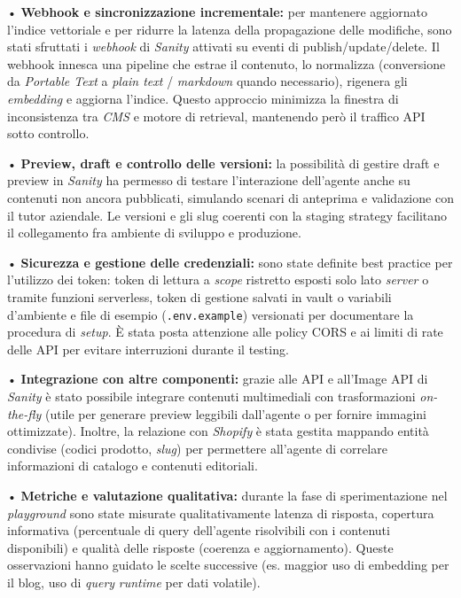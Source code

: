 • \textbf{Webhook e sincronizzazione incrementale:} per mantenere aggiornato l'indice vettoriale e per ridurre la latenza della propagazione delle modifiche, sono stati sfruttati i 
\emph{webhook} di \emph{Sanity} attivati su eventi di publish/update/delete. Il webhook innesca una pipeline che estrae il contenuto, lo normalizza 
(conversione da \emph{Portable Text} a \emph{plain text} / \emph{markdown} quando necessario), 
rigenera gli \emph{embedding} e aggiorna l'indice. 
Questo approccio minimizza la finestra di inconsistenza tra \emph{CMS} e motore di retrieval, mantenendo però il traffico API sotto controllo.

• \textbf{Preview, draft e controllo delle versioni:} la possibilità di gestire draft e preview in \emph{Sanity} 
ha permesso di testare l'interazione dell'agente anche su contenuti non ancora pubblicati, simulando scenari di anteprima e validazione con il tutor aziendale. 
Le versioni e gli slug coerenti con la staging strategy facilitano il collegamento fra ambiente di sviluppo e produzione.

• \textbf{Sicurezza e gestione delle credenziali:} sono state definite best practice per l'utilizzo dei token: token di lettura a \emph{scope} ristretto esposti solo lato \emph{server}
 o tramite funzioni serverless, token di gestione salvati in vault o variabili d'ambiente e file di esempio (\texttt{.env.example}) versionati per documentare la procedura di \emph{setup}. 
 È stata posta attenzione alle policy CORS e ai limiti di rate delle API per evitare interruzioni durante il testing.

• \textbf{Integrazione con altre componenti:} grazie alle API e all'Image API di \emph{Sanity} è stato possibile integrare contenuti multimediali con trasformazioni \emph{on-the-fly} 
(utile per generare preview leggibili dall'agente o per fornire immagini ottimizzate). Inoltre, la relazione con \emph{Shopify} è stata gestita mappando entità condivise (codici prodotto, \emph{slug}) 
per permettere all'agente di correlare informazioni di catalogo e contenuti editoriali.

• \textbf{Metriche e valutazione qualitativa:} durante la fase di sperimentazione nel \emph{playground} sono state misurate qualitativamente latenza di risposta, 
copertura informativa (percentuale di query dell'agente risolvibili con i contenuti disponibili) e qualità delle risposte (coerenza e aggiornamento). 
Queste osservazioni hanno guidato le scelte successive (es. maggior uso di embedding per il blog, uso di \emph{query} \emph{runtime} per dati volatile).

